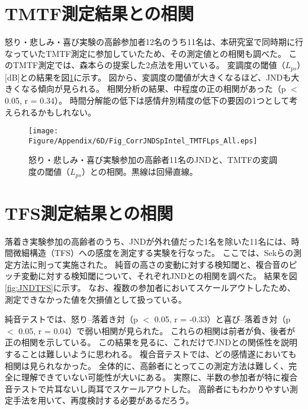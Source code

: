 \section{TMTF測定結果との相関}
怒り・悲しみ・喜び実験の高齢参加者12名のうち11名は、本研究室で同時期に行なっていたTMTF測定に参加していたため、その測定値との相関も調べた。
このTMTF測定では、森本らの提案した2点法を用いている\cite{morimoto2019Two-PointTMTF}。
変調度の閾値（$L_{ps}$）[dB]との結果を図\ref{fig:JNDTMTF}に示す。
図から、変調度の閾値が大きくなるほど、JNDも大きくなる傾向が見られる。
相関分析の結果、中程度の正の相関があった（p $<$ 0.05, r = 0.34）。
時間分解能の低下は感情弁別精度の低下の要因の1つとして考えられるかもしれない。


\begin{figure}[htbp]
  \vspace{40pt}
  \centering
  \texttt{[image: Figure/Appendix/6D/Fig\_CorrJNDSpIntel\_TMTFLps\_All.eps]}
  \caption{怒り・悲しみ・喜び実験参加の高齢者11名のJNDと、TMTFの変調度の閾値（$L_{ps}$）との相関。黒線は回帰直線。}
  \label{fig:JNDTMTF}
\end{figure}




\section{TFS測定結果との相関}
落着き実験参加の高齢者のうち、JNDが外れ値だった1名を除いた11名には、時間微細構造（TFS）への感度を測定する実験を行なった。
ここでは、Sekらの測定方法\cite{Sek2022Guide,Sek2012TFS1}に則って実施された。
純音の高さの変動に対する検知閾と、複合音のピッチ変動に対する検知閾について、それぞれJNDとの相関を調べた。
結果を図\ref{fig:JNDTFS}に示す。
なお、複数の参加者においてスケールアウトしたため、測定できなかった値を欠損値として扱っている。

純音テストでは、怒り--落着き対（p $<$ 0.05, r = -0.33）と喜び--落着き対（p $<$ 0.05, r = 0.04）で弱い相関が見られた。
これらの相関は前者が負、後者が正の相関を示している。
この結果を見るに、これだけでJNDとの関係性を説明することは難しいように思われる。
複合音テストでは、どの感情遂においても相関は見られなかった。
全体的に、高齢者にとってこの測定方法は難しく、完全に理解できていない可能性が大いにある。
実際に、半数の参加者が特に複合音テストで片耳ないし両耳でスケールアウトした。
高齢者にもわかりやすい測定手法を用いて、再度検討する必要があるだろう。



